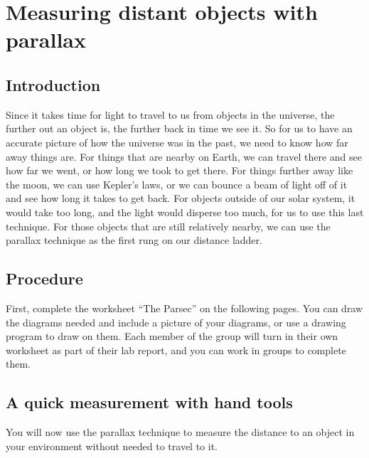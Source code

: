 \chapter{Measuring distant objects with parallax}


\section{Introduction}

Since it takes time for light to travel to us from objects in the universe, the further out an object is, the further back in time we see it. So for us to have an accurate picture of how the universe was in the past, we need to know how far away things are. For things that are nearby on Earth, we can travel there and see how far we went, or how long we took to get there. For things further away like the moon, we can use Kepler's laws, or we can bounce a beam of light off of it and see how long it takes to get back. For objects outside of our solar system, it would take too long, and the light would disperse too much, for us to use this last technique. For those objects that are still relatively nearby, we can use the parallax technique as the first rung on our distance ladder.

\section{Procedure}

First, complete the worksheet ``The Parsec'' on the following pages. You can draw the diagrams needed and include a picture of your diagrams, or use a drawing program to draw on them. Each member of the group will turn in their own worksheet as part of their lab report, and you can work in groups to complete them.



\section{A quick measurement with hand tools}

You will now use the parallax technique to measure the distance to an object in your environment without needed to travel to it.


